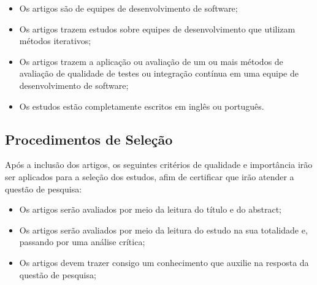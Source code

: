 \begin{itemize}
    \item Os artigos são de equipes de desenvolvimento de software;
    \item Os artigos trazem estudos sobre equipes de desenvolvimento que
        utilizam métodos iterativos;
    \item Os artigos trazem a aplicação ou avaliação de um ou mais
        métodos de avaliação de qualidade de testes ou integração contínua
        em uma equipe de desenvolvimento de software;
    \item Os estudos estão completamente escritos em inglês ou português.
\end{itemize}

\subsection{Procedimentos de Seleção}
\label{sub:Procedimentos de Seleção}

Após a inclusão dos artigos, os seguintes critérios de qualidade e
importância irão ser aplicados para a seleção dos estudos, afim de certificar que
irão atender a questão de pesquisa:

\begin{itemize}
    \item Os artigos serão avaliados por meio da leitura do título e do abstract;
    \item Os artigos serão avaliados por meio da leitura do estudo na sua
        totalidade e, passando por uma análise crítica;
    \item Os artigos devem trazer consigo um conhecimento que auxilie na
        resposta da questão de pesquisa;
\end{itemize}

